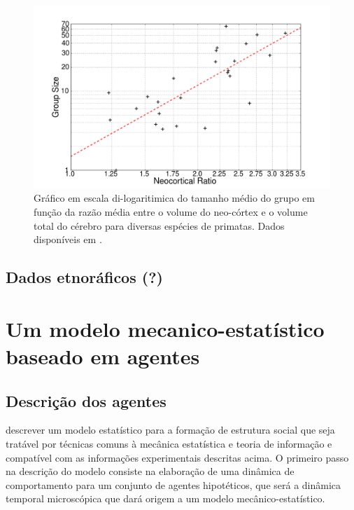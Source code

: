 \begin{figure}
	\centering
	\includegraphics[width = 1.1\textwidth]{figuras/dunbar.png}
	\caption{\label{fig:dunbarlaw} Gráfico em escala di-logaritimica do tamanho médio do grupo em função da razão média entre o volume do neo-córtex e o volume total do cérebro para diversas espécies de primatas. Dados disponíveis em \citep{Dunbar2009}.}
\end{figure}

\subsection{Dados etnoráficos (?)}
\section{Um modelo mecanico-estatístico baseado em agentes}
\subsection{Descrição dos agentes}

 descrever um modelo estatístico para a formação de estrutura social que seja tratável por técnicas comuns à mecânica estatística e teoria de informação e compatível com as informações experimentais descritas acima. O primeiro passo na descrição do modelo consiste na elaboração de uma dinâmica de comportamento para um conjunto de agentes hipotéticos, que será a dinâmica temporal microscópica que dará origem a um modelo mecânico-estatístico. 

